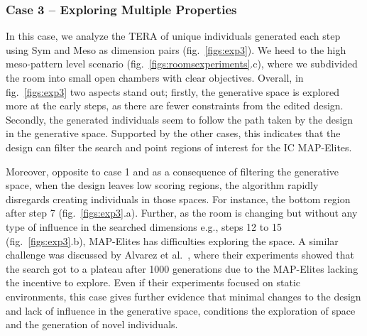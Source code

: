 

\subsubsection{Case 3 – Exploring Multiple Properties}
\label{sec:case3}


In this case, we analyze the TERA of unique individuals generated each step using Sym and Meso as dimension pairs (fig.~\ref{figs:exp3}). We heed to the high meso-pattern level scenario (fig.~\ref{figs:roomsexperiments}.c), where we subdivided the room into small open chambers with clear objectives. Overall, in fig.~\ref{figs:exp3} two aspects stand out; firstly, the generative space is explored more at the early steps, as there are fewer constraints from the edited design. Secondly, the generated individuals seem to follow the path taken by the design in the generative space. Supported by the other cases, this indicates that the design can filter the search and point regions of interest for the IC MAP-Elites. %

Moreover, opposite to case 1 and as a consequence of filtering the generative space, when the design leaves low scoring regions, the algorithm rapidly disregards creating individuals in those spaces. For instance, the bottom region after step 7 (fig.~\ref{figs:exp3}.a). Further, as the room is changing but without any type of influence in the searched dimensions e.g., steps 12 to 15 (fig.~\ref{figs:exp3}.b), MAP-Elites has difficulties exploring the space. A similar challenge was discussed by Alvarez et al.~\cite{p9Alvarez2020-ICMAPE}, where their experiments showed that the search got to a plateau after 1000 generations due to the MAP-Elites lacking the incentive to explore. Even if their experiments focused on static environments, this case gives further evidence that minimal changes to the design and lack of influence in the generative space, conditions the exploration of space and the generation of novel individuals. 

